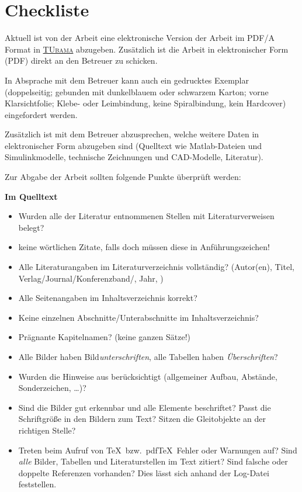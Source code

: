 \chapter{Checkliste}
\label{cha:Checkliste}

Aktuell ist von der Arbeit eine elektronische Version der Arbeit im PDF/A Format in \href{https://tubama.ulb.tu-darmstadt.de/}{\textsc{TUbama}} abzugeben.
Zusätzlich ist die Arbeit in elektronischer Form (PDF) direkt an den Betreuer zu schicken.

In Absprache mit dem Betreuer kann auch ein gedrucktes Exemplar (doppelseitig; gebunden mit dunkelblauem oder schwarzem Karton; vorne Klarsichtfolie; Klebe- oder Leimbindung, keine Spiralbindung, kein Hardcover) eingefordert werden.

Zusätzlich ist mit dem Betreuer abzusprechen, welche weitere Daten in elektronischer Form abzugeben sind (Quelltext wie Matlab-Dateien und Simulinkmodelle, technische Zeichnungen und CAD-Modelle, Literatur).

Zur Abgabe der Arbeit sollten folgende Punkte überprüft werden:


\renewcommand{\labelitemi}{%
  \setlength{\fboxsep}{.6ex}\raisebox{.7ex}{\framebox{}}}

\textbf{Im Quelltext}
\begin{itemize}
  \item Wurden alle der Literatur entnommenen Stellen mit Literaturverweisen belegt?
  \item keine wörtlichen Zitate, falls doch müssen diese in Anführungszeichen!
  \item Alle Literaturangaben im Literaturverzeichnis vollständig? (Autor(en), Titel, Verlag/Journal/Konferenzband/\etc, Jahr, \usw)
  \item Alle Seitenangaben im Inhaltsverzeichnis korrekt?
  \item Keine einzelnen Abschnitte/Unterabschnitte im Inhaltsverzeichnis?
  \item Prägnante Kapitelnamen? (keine ganzen Sätze!)
  \item Alle Bilder haben Bild\emph{unterschriften}, alle Tabellen haben \emph{Überschriften}?
  \item Wurden die Hinweise aus  berücksichtigt (allgemeiner Aufbau, Abstände, Sonderzeichen, \ldots)?
  \item Sind die Bilder gut erkennbar und alle Elemente beschriftet?
    Passt die Schriftgröße in den Bildern zum Text?
    Sitzen die Gleitobjekte an der richtigen Stelle?
  \item Treten beim Aufruf von \TeX\ bzw.\ pdf\TeX\ Fehler oder Warnungen auf?
    Sind \emph{alle} Bilder, Tabellen und Literaturstellen im  Text zitiert?
    Sind falsche oder doppelte Referenzen vorhanden?
    Dies lässt sich anhand der Log-Datei feststellen.
\end{itemize}

